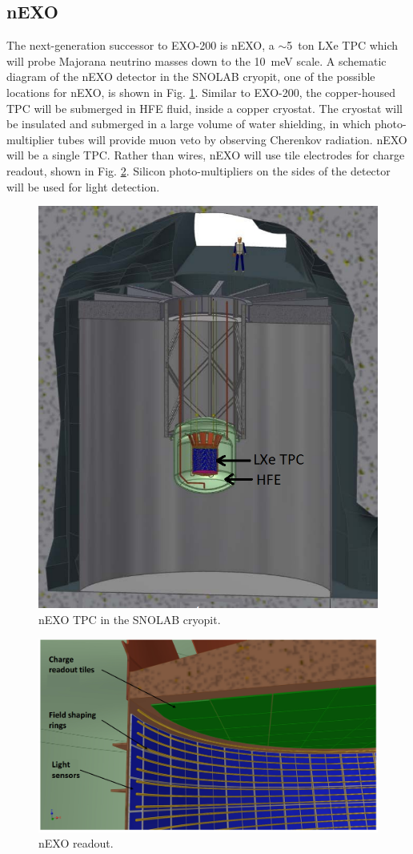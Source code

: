 \subsection{nEXO}

The next-generation successor to EXO-200 is nEXO, a $\sim$5~ton LXe TPC which will probe Majorana neutrino masses down to the 10~meV scale.  A schematic diagram of the nEXO detector in the SNOLAB cryopit, one of the possible locations for nEXO, is shown in Fig. \ref{fig:nEXO_cryopit}.  Similar to EXO-200, the copper-housed TPC will be submerged in HFE fluid, inside a copper cryostat.  The cryostat will be insulated and submerged in a large volume of water shielding, in which photo-multiplier tubes will provide muon veto by observing Cherenkov radiation.  nEXO will be a single TPC.  Rather than wires, nEXO will use tile electrodes for charge readout, shown in Fig. \ref{fig:nEXO_readout}.  Silicon photo-multipliers on the sides of the detector will be used for light detection.

\begin{figure} %
	\centering
	\includegraphics[width=.7\textwidth]{figures/nEXO_cryopit.png}
	\caption{nEXO TPC in the SNOLAB cryopit.}
\label{fig:nEXO_cryopit}
\end{figure}

\begin{figure} %
	\centering
	\includegraphics[width=.7\textwidth]{figures/nEXO_readout.png}
	\caption{nEXO readout.}
\label{fig:nEXO_readout}
\end{figure}

